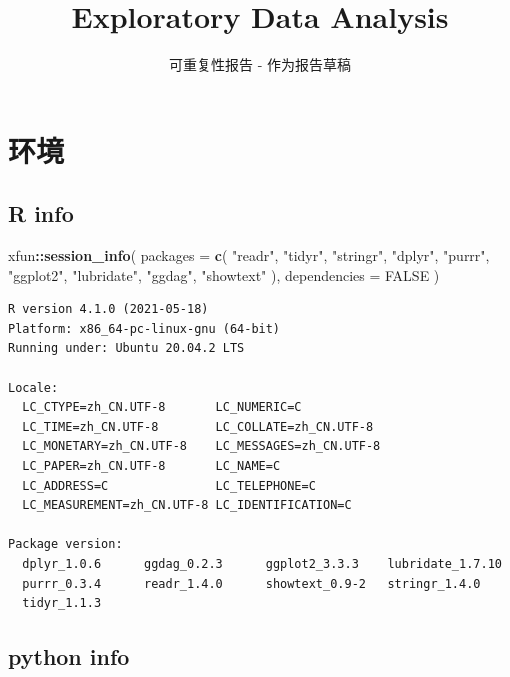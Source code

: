 \documentclass[]{ctexart}
\title{Exploratory Data Analysis}
\subtitle{可重复性报告 - 作为报告草稿}
\author{}
\date{\vspace{-2.5em}}
\newenvironment{Shaded}{\begin{snugshade}}{\end{snugshade}}
\newcommand{\DataTypeTok}[1]{\textcolor[rgb]{0.13,0.29,0.53}{#1}}
\newcommand{\KeywordTok}[1]{\textcolor[rgb]{0.13,0.29,0.53}{\textbf{#1}}}
\newcommand{\NormalTok}[1]{#1}
\newcommand{\OperatorTok}[1]{\textcolor[rgb]{0.81,0.36,0.00}{\textbf{#1}}}
\newcommand{\OtherTok}[1]{\textcolor[rgb]{0.56,0.35,0.01}{#1}}
\newcommand{\StringTok}[1]{\textcolor[rgb]{0.31,0.60,0.02}{#1}}
\begin{document}
\maketitle

{
\setcounter{tocdepth}{2}
\tableofcontents
}
\hypertarget{ux73afux5883}{%
\section{环境}\label{ux73afux5883}}

\hypertarget{r-info}{%
\subsection{R info}\label{r-info}}

\begin{Shaded}
\begin{Highlighting}[]
\NormalTok{xfun}\OperatorTok{::}\KeywordTok{session_info}\NormalTok{(}
        \DataTypeTok{packages =} \KeywordTok{c}\NormalTok{(}
                \StringTok{"readr"}\NormalTok{, }\StringTok{"tidyr"}\NormalTok{, }\StringTok{"stringr"}\NormalTok{, }\StringTok{"dplyr"}\NormalTok{, }\StringTok{"purrr"}\NormalTok{,}
                \StringTok{"ggplot2"}\NormalTok{, }\StringTok{"lubridate"}\NormalTok{, }\StringTok{"ggdag"}\NormalTok{, }\StringTok{"showtext"}
\NormalTok{        ), }\DataTypeTok{dependencies =} \OtherTok{FALSE}
\NormalTok{)}
\end{Highlighting}
\end{Shaded}

\begin{verbatim}
R version 4.1.0 (2021-05-18)
Platform: x86_64-pc-linux-gnu (64-bit)
Running under: Ubuntu 20.04.2 LTS

Locale:
  LC_CTYPE=zh_CN.UTF-8       LC_NUMERIC=C              
  LC_TIME=zh_CN.UTF-8        LC_COLLATE=zh_CN.UTF-8    
  LC_MONETARY=zh_CN.UTF-8    LC_MESSAGES=zh_CN.UTF-8   
  LC_PAPER=zh_CN.UTF-8       LC_NAME=C                 
  LC_ADDRESS=C               LC_TELEPHONE=C            
  LC_MEASUREMENT=zh_CN.UTF-8 LC_IDENTIFICATION=C       

Package version:
  dplyr_1.0.6      ggdag_0.2.3      ggplot2_3.3.3    lubridate_1.7.10
  purrr_0.3.4      readr_1.4.0      showtext_0.9-2   stringr_1.4.0   
  tidyr_1.1.3     
\end{verbatim}

\hypertarget{python-info}{%
\subsection{python info}\label{python-info}}
\end{document}

